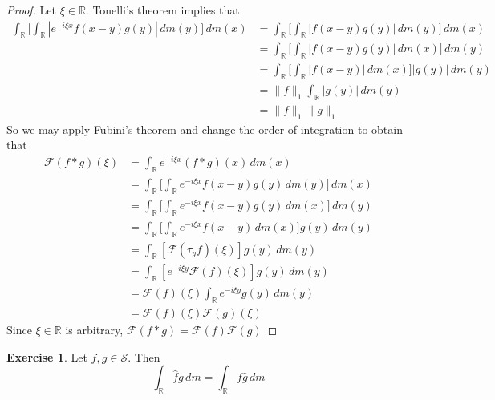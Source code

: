 \documentclass[12pt]{amsart}
\theoremstyle{definition}
\newtheorem{ex}[definition]{Exercise}
\newcommand{\R}{\mathbb{R}}
\newcommand{\MF}{\mathcal{F}}
\newcommand{\MS}{\mathcal{S}}
\newcommand{\dm}{\, d m}
\begin{document}
	\begin{proof}
		Let $\xi \in \R$. Tonelli's theorem implies that  
		\begin{align*}
			\int_{\R} \bigg[ \int_{\R} | e^{-i\xi x} f(x-y)g(y)| \dm(y) \bigg] \dm(x)
			& = \int_{\R}  \bigg[ \int_{\R}  |f(x-y)g(y) |\dm(y) \bigg] \dm(x) \\
			& = \int_{\R}  \bigg[ \int_{\R}  |f(x-y)g(y) |\dm(x) \bigg] \dm(y) \\
			& = \int_{\R}  \bigg[ \int_{\R}  |f(x-y) |\dm(x) \bigg] |g(y)| \dm(y) \\
			& = \|f\|_1 \int_{\R} |g(y)| \dm(y) \\
			& = \|f\|_1\|g\|_1
		\end{align*}
		So we may apply Fubini's theorem and change the order of integration to obtain that
		\begin{align*}
			\MF(f*g)(\xi)
			& = \int_{\R} e^{-i\xi x} (f*g)(x) \dm(x) \\
			& = \int_{\R}  \bigg[ \int_{\R} e^{-i\xi x} f(x-y)g(y) \dm(y) \bigg] \dm(x) \\
			& = \int_{\R}  \bigg[ \int_{\R} e^{-i\xi x} f(x-y)g(y) \dm(x) \bigg] \dm(y) \\
			& = \int_{\R}  \bigg[ \int_{\R} e^{-i\xi x} f(x-y) \dm(x) \bigg] g(y) \dm(y) \\
			& = \int_{\R}  [\MF(\tau_yf)(\xi) ] g(y) \dm(y) \\
			& = \int_{\R}  [e^{-i \xi y}\MF(f)(\xi) ] g(y) \dm(y) \\
			& = \MF(f)(\xi) \int_{\R}  e^{-i \xi y}  g(y) \dm(y) \\
			& = \MF(f)(\xi) \MF(g)(\xi)
		\end{align*}
		Since $\xi \in \R$ is arbitrary, $\MF(f*g) = \MF(f) \MF(g)$
	\end{proof}

	\begin{ex}
		Let $f,g \in \MS$. Then $$\int_{\R}\hat{f} g \dm = \int_{\R}f \hat{g}  \dm$$
	\end{ex}
	
\end{document}
